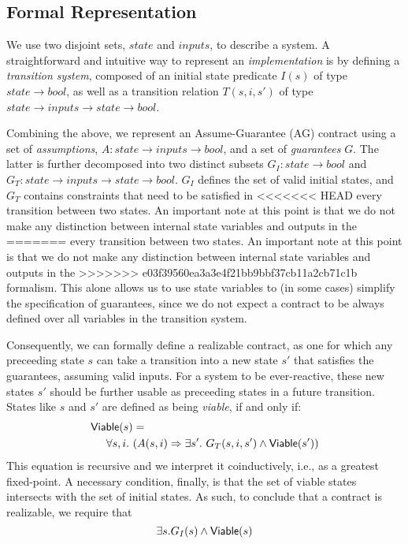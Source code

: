 \subsection{Formal Representation}
\label{sec:formals}
We use two disjoint sets, $state$ and $inputs$, to describe a system.
A straightforward and intuitive way to represent an \emph{implementation} is by
defining a \emph{transition system}, composed of an initial state
predicate $I(s)$ of type $state \to bool$, as well as a transition relation
$T(s,i,s')$ of type $state \to inputs \to state \to bool$.

Combining the above, we represent an Assume-Guarantee (AG) contract using a set
of \emph{assumptions}, $A: state \rightarrow inputs \rightarrow bool$,
and a set of \emph{guarantees} $G$. The latter is further decomposed into two
distinct subsets $G_I: state \rightarrow bool$ and $G_T: state \rightarrow
inputs \rightarrow state \rightarrow bool$. $G_I$ defines the set of valid
initial states, and $G_T$ contains constraints that need to be satisfied in
<<<<<<< HEAD
every transition between two states. An important note at this point is that we
do not make any distinction between internal state variables and outputs in the
=======
every transition between two states. An important note at this point is that
we do not make any distinction between internal state variables and outputs in the
>>>>>>> e03f39560ea3a3e4f21bb9bbf37cb11a2cb71c1b
formalism. This alone allows us to use state variables to (in some cases)
simplify the specification of guarantees, since we do not expect a contract
to be always defined over all variables in the transition system.

Consequently, we can formally define a realizable contract, as one for which any
preceeding state $s$ can take a transition into a new state $s'$ that satisfies
the guarantees, assuming valid inputs. For a system to be ever-reactive, these
new states $s'$ should be further usable as preceeding states in a future
transition. States like $s$ and $s'$ are defined as being \textit{viable}, if
and only if:
\begin{align}
\begin{split}
  {\mathsf {Viable}}(s) &= \\
  \forall s,i. \ & (A(s, i) \Rightarrow \exists s'.~ G_T(s, i,s')
\land {\mathsf {Viable}}(s'))
\label{eq:viable}
\end{split}
\end{align}
This equation is recursive and we interpret it coinductively, i.e., as a
greatest fixed-point.
A necessary condition, finally, is that the set of viable states
intersects with the set of initial states. As such, to conclude that a contract
is realizable, we require that
\begin{equation}
\exists s. G_I(s) \land {\mathsf {Viable}}(s)
\label{eq:nonempty}
\end{equation}

